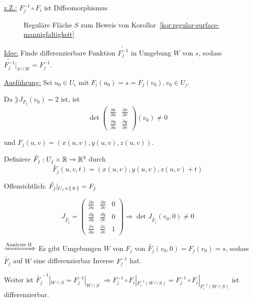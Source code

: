 \begin{beweis}
    \underline{z.Z.:} $F_j^{-1} \circ F_i$ ist Diffeomorphismus

    \begin{figure}[htp]
        \centering
        
        \caption{Reguläre Fläche $S$ zum Beweis von Korollar~\ref{kor:regular-surface-mannigfaltigkeit}}
        \label{fig:parametric-surface-mapping}
    \end{figure}
    

    \underline{Idee:} Finde differenzierbare Funktion $\tilde{F_j^{-1}}$
    in Umgebung $W$ von $s$, sodass $\tilde{F_j^{-1}}|_{S \cap W} = F_j^{-1}$.

    \underline{Ausführung:} Sei $u_0 \in U_i$ mit $F_i(u_0) = s = F_j(v_0), v_0 \in U_j$.

    Da $\rang{J_{F_j}(v_0)} = 2$ ist, ist \obda 
    \[\det 
        \begin{pmatrix}
            \frac{\partial x}{\partial u} & \frac{\partial x}{\partial v}\\
            \frac{\partial y}{\partial u} & \frac{\partial y}{\partial v}
        \end{pmatrix} (v_0) \neq 0
    \]

    und $F_j(u,v) = \left ( x(u,v), y(u,v), z(u,v) \right)$.

    Definiere $\tilde{F_j}: U_j \times \mathbb{R} \rightarrow \mathbb{R}^3$ durch
    \[\tilde{F_j} (u, v, t) = \left(x(u,v), y(u,v), z(u,v)+t \right )\]
    
    Offensichtlich: $\tilde{F_j} |_{U_j \times \Set{0}} = F_j$

    \[J_{\tilde{F_j}} = 
    \begin{pmatrix}
        \frac{\partial x}{\partial u}   & \frac{\partial x}{\partial v} & 0\\
        \frac{\partial y}{\partial u}   & \frac{\partial y}{\partial v} & 0\\
        \frac{\partial z}{\partial u}   & \frac{\partial z}{\partial v} & 1
    \end{pmatrix} \Rightarrow \det J_{\tilde{F_j}} (v_0, 0) \neq  0\]

    $\xRightarrow{\text{Analysis II}}$ Es gibt Umgebungen $W$ von
    $F_j$ von $\tilde{F_j}(v_0, 0) = F_j(v_0) = s$, sodass $\tilde{F_j}$
    auf $W$ eine differenzierbar Inverse $F_j^{-1}$ hat.

    Weiter ist $\tilde{F_j}^{-1}|_{W \cap S} = F_j^{-1} |_{W \cap S}$
    $\Rightarrow F_j^{-1} \circ F_i |_{F_i^{-1} (W \cap S)} = F_j^{-1} \circ F_i |_{F_i^{-1} (W \cap S)}$
    ist differenzierbar.
\end{beweis}

